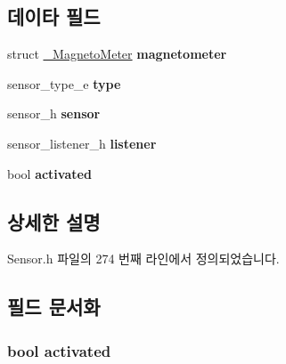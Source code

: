 \subsection*{데이타 필드}
\begin{DoxyCompactItemize}
\item 
\hypertarget{struct__MagnetoMeterExtend_a8679591114ee0c09969a82b9bd9f9fe4}{struct \hyperlink{struct__MagnetoMeter}{\-\_\-\-Magneto\-Meter} {\bfseries magnetometer}}\label{struct__MagnetoMeterExtend_a8679591114ee0c09969a82b9bd9f9fe4}

\item 
\hypertarget{struct__MagnetoMeterExtend_abffb09766da2fc510a79bb51f82a36e1}{sensor\-\_\-type\-\_\-e {\bfseries type}}\label{struct__MagnetoMeterExtend_abffb09766da2fc510a79bb51f82a36e1}

\item 
\hypertarget{struct__MagnetoMeterExtend_a5bae9b7801bc3808411925cde81d3f26}{sensor\-\_\-h {\bfseries sensor}}\label{struct__MagnetoMeterExtend_a5bae9b7801bc3808411925cde81d3f26}

\item 
\hypertarget{struct__MagnetoMeterExtend_aa977dfb866b24fd7d9a20a9a01b2fd1f}{sensor\-\_\-listener\-\_\-h {\bfseries listener}}\label{struct__MagnetoMeterExtend_aa977dfb866b24fd7d9a20a9a01b2fd1f}

\item 
\hypertarget{struct__MagnetoMeterExtend_a73e9fa0c3543560192f38a8ab6a78c47}{bool {\bfseries activated}}\label{struct__MagnetoMeterExtend_a73e9fa0c3543560192f38a8ab6a78c47}

\end{DoxyCompactItemize}


\subsection{상세한 설명}


Sensor.\-h 파일의 274 번째 라인에서 정의되었습니다.



\subsection{필드 문서화}
\hypertarget{struct__MagnetoMeterExtend_a73e9fa0c3543560192f38a8ab6a78c47}{
\subsubsection[{activated}]{\setlength{\rightskip}{0pt plus 5cm}bool activated}}\label{struct__MagnetoMeterExtend_a73e9fa0c3543560192f38a8ab6a78c47}


